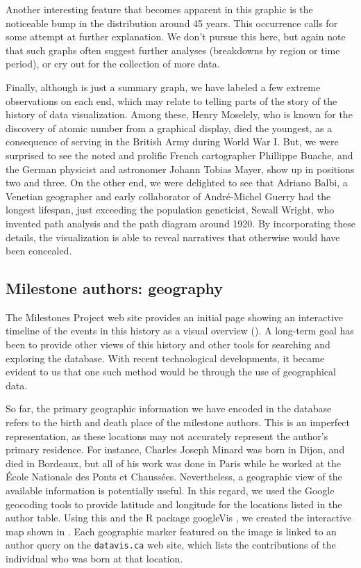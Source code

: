 Another interesting feature that becomes apparent in this graphic is the noticeable bump in the distribution around 45 years. This occurrence calls for some attempt at further explanation. We don't pursue this here, but again note that such graphs often suggest further analyses (breakdowns by region or time period), or cry out for the collection of more data.

Finally, although  is just a summary graph, we have labeled a few extreme observations on each end, which may relate to telling parts of the story of the history of data visualization.  Among these, Henry Moselely, who is known for the discovery of atomic number from a graphical display, died the youngest, as a consequence of serving in the British Army during World War I. But, we were surprised to see the noted and prolific French cartographer Phillippe Buache, and the German physicist and astronomer Johann Tobias Mayer, show up in positions two and three.  On the other end, we were delighted to see that Adriano Balbi, a Venetian geographer and early collaborator of Andr{\'e}-Michel Guerry \citep{BalbiGuerry:1829} had the longest lifespan, just exceeding the population geneticist, Sewall Wright, who invented path analysis and the path diagram around 1920.  By incorporating these details, the visualization is able to reveal narratives that otherwise would have been concealed.

\subsection{Milestone authors: geography}\label{sec:geography}
The Milestones Project web site provides an initial page showing an interactive timeline of the events in this history as a visual overview (). A long-term goal has been to provide other views of this history and other tools for searching and exploring the database. With recent technological developments, it became evident to us that one such method would be through the use of geographical data.

So far, the primary geographic information we have encoded in the database refers to the birth and death place of the milestone authors. 
This is an imperfect representation, as these locations may not accurately represent the author's primary residence.  
For instance, Charles Joseph Minard was born in Dijon, and died in Bordeaux, but all of his work was done in Paris while he 
worked at the {\'E}cole Nationale des Ponts et Chauss{\'e}es. Nevertheless, a geographic view of the available information is potentially useful. 
In this regard, we used the Google geocoding tools to provide latitude and longitude for the locations listed in the author table.  
Using this and the R package googleVis \citep{googleVis}, we created the interactive map shown in .  
Each geographic marker featured on the image is linked to an author query on the \texttt{datavis.ca} web site, 
which lists the contributions of the individual who was born at that location.


